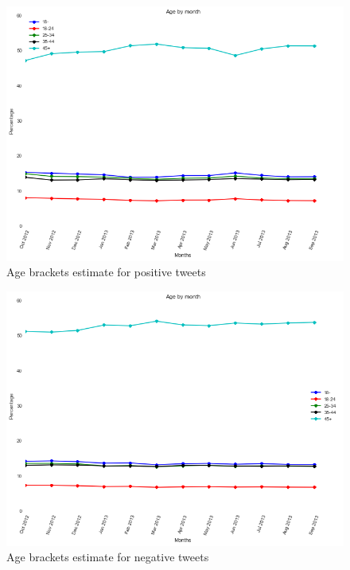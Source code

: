 \documentclass{sig-alternate}
\begin{document}
\begin{figure}[t]
\includegraphics[width=\columnwidth]{pos_45+.png}
\centering
\caption{Age brackets estimate for positive tweets}
\label{figura:pos_45+}
\end{figure}

\begin{figure}[t]
\includegraphics[width=\columnwidth]{neg_45+.png}
\centering
\caption{ Age brackets estimate for negative tweets}
\label{figura:neg_45+}
\end{figure}
\end{document}
